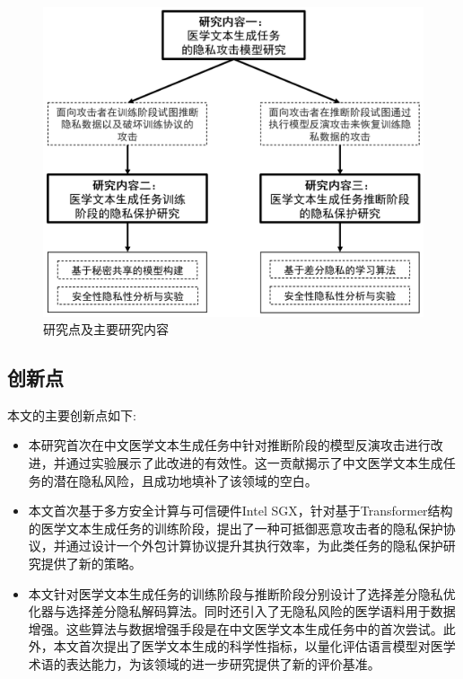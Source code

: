 \begin{figure}[h]
	\centering
	\includegraphics[width=0.85\linewidth]{figures/Three_Chap_Structure.png}
	\caption{研究点及主要研究内容}
	\label{Three_Chap_Structure}
\end{figure}

\subsection{创新点}

本文的主要创新点如下:

\begin{itemize}
	\item 本研究首次在中文医学文本生成任务中针对推断阶段的模型反演攻击进行改进，并通过实验展示了此改进的有效性。这一贡献揭示了中文医学文本生成任务的潜在隐私风险，且成功地填补了该领域的空白。
	
	
	\item 本文首次基于多方安全计算与可信硬件Intel SGX，针对基于Transformer结构的医学文本生成任务的训练阶段，提出了一种可抵御恶意攻击者的隐私保护协议，并通过设计一个外包计算协议提升其执行效率，为此类任务的隐私保护研究提供了新的策略。
	
	\item 本文针对医学文本生成任务的训练阶段与推断阶段分别设计了选择差分隐私优化器与选择差分隐私解码算法。同时还引入了无隐私风险的医学语料用于数据增强。这些算法与数据增强手段是在中文医学文本生成任务中的首次尝试。此外，本文首次提出了医学文本生成的科学性指标，以量化评估语言模型对医学术语的表达能力，为该领域的进一步研究提供了新的评价基准。%
	
\end{itemize}


